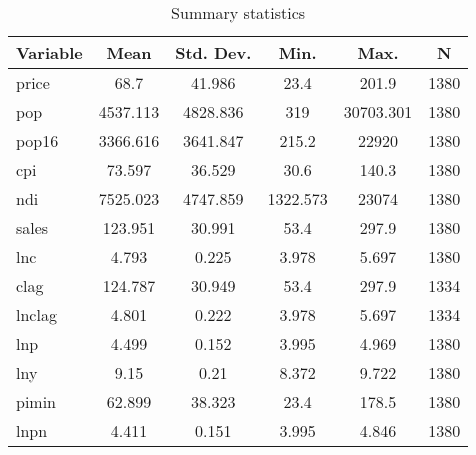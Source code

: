 
\begin{table}[htbp]\centering \caption{Summary statistics \label{sumstat}}
\begin{tabular}{l c c c c c}\hline\hline
\multicolumn{1}{c}{\textbf{Variable}} & \textbf{Mean}
 & \textbf{Std. Dev.}& \textbf{Min.} &  \textbf{Max.} & \textbf{N}\\ \hline
price & 68.7 & 41.986 & 23.4 & 201.9 & 1380\\
pop & 4537.113 & 4828.836 & 319 & 30703.301 & 1380\\
pop16 & 3366.616 & 3641.847 & 215.2 & 22920 & 1380\\
cpi & 73.597 & 36.529 & 30.6 & 140.3 & 1380\\
ndi & 7525.023 & 4747.859 & 1322.573 & 23074 & 1380\\
sales & 123.951 & 30.991 & 53.4 & 297.9 & 1380\\
lnc & 4.793 & 0.225 & 3.978 & 5.697 & 1380\\
clag & 124.787 & 30.949 & 53.4 & 297.9 & 1334\\
lnclag & 4.801 & 0.222 & 3.978 & 5.697 & 1334\\
lnp & 4.499 & 0.152 & 3.995 & 4.969 & 1380\\
lny & 9.15 & 0.21 & 8.372 & 9.722 & 1380\\
pimin & 62.899 & 38.323 & 23.4 & 178.5 & 1380\\
lnpn & 4.411 & 0.151 & 3.995 & 4.846 & 1380\\
\hline\end{tabular}
\end{table}
